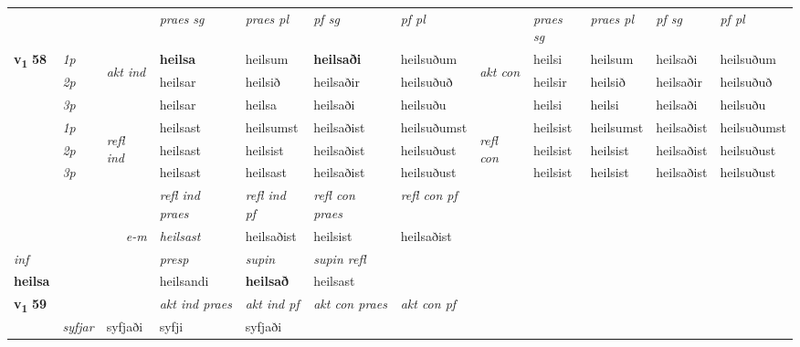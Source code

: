 \begin{longtable}[l]{X>{\footnotesize\itshape}llXXXXlXXXX}
\midrule

 & &   & \textit{praes sg}  & \textit{praes pl}    & \textit{ pf sg} & \textit{pf pl} & & \textit{praes sg}  & \textit{praes pl}    & \textit{pf sg} & \textit{pf pl }  \\ \cmidrule{4-7} \cmidrule{9-12}
 \multirow{2}{*}{{{\textbf{v{\textsubscript{1}}} \Large{\textbf{58}}}}}  & 1p & \multirow{3}{*}{\begin{turn}{90}\textit{akt ind}\end{turn}} & \textbf{heilsa} & heilsum & \textbf{heilsaði} & heilsuðum & \multirow{3}{*}{\begin{turn}{90}\textit{akt con}\end{turn}} &heilsi & heilsum & heilsaði & heilsuðum\\*
 & 2p &  &  heilsar  & heilsið & heilsaðir & heilsuðuð & & heilsir & heilsið & heilsaðir & heilsuðuð \\*
 & 3p &  & heilsar & heilsa & heilsaði & heilsuðu & & heilsi & heilsi& heilsaði & heilsuðu \\*
\cmidrule{4-7} \cmidrule{9-12}
 & 1p & \multirow{3}{*}{\begin{turn}{90}\textit{refl ind}\end{turn}}  & heilsast & heilsumst & heilsaðist & heilsuðumst & \multirow{3}{*}{\begin{turn}{90}\textit{refl con}\end{turn}}  &heilsist & heilsumst & heilsaðist & heilsuðumst \\*
 & 2p &  & heilsast & heilsist & heilsaðist & heilsuðust & &heilsist & heilsist & heilsaðist & heilsuðust \\*
 & 3p  & & heilsast & heilsast & heilsaðist & heilsuðust & & heilsist & heilsist& heilsaðist & heilsuðust \\*
\cmidrule{4-7} \cmidrule{9-12}

 & && \textit{refl ind praes} & \textit{refl ind pf} & \textit{refl con praes} & \textit{refl con pf} \\*
\multicolumn{3}{r}{\textit{e-m}}& heilsast & heilsaðist & heilsist & heilsaðist \\*

\cmidrule{4-7}
   {\textit{inf}} & &     & \textit{presp} & \textit{supin} & \textit{supin refl}  \\*
  {\textbf{heilsa}} & &     & heilsandi &  \textbf{heilsað} & heilsast  \\*

\midrule

\multirow{2}{*}{{{\textbf{v{\textsubscript{1}}} \Large{\textbf{59}}}}}  &&&  \textit{akt ind praes} & \textit{akt ind pf} & \textit{akt con praes} & \textit{akt con pf} \\*
\multicolumn{3}{r}{\textit{e-n}} & syfjar & syfjaði & syfji & syfjaði \\*


\end{longtable}
